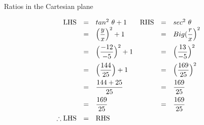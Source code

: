 \begin{wex}{Ratios in the Cartesian plane}
{
\begin{equation*}
\begin{array}{rclrcl}
 \hfill \mbox{LHS} &=&  tan^{2}~\theta + 1 	&	\mbox{RHS}	&=&  	sec^{2}~\theta \hfill \\
\hfill &=& \Big(\dfrac{y}{x}\Big)^{2} + 1  	&	&=&  Big(\dfrac{r}{x}\Big)^{2} \hfill \vspace{5pt} \\
\hfill&=&  \Big(\dfrac{-12}{-5}\Big)^{2} + 1 	&	&=&  \Big(\dfrac{13}{-5}\Big)^{2} \hfill \vspace{5pt}\\
\hfill&=&  \Big (\dfrac{144}{25}\Big) + 1  	&	&=&  \Big(\dfrac{169}{25}\Big)^{2} \hfill \vspace{5pt}\\
\hfill &=& \dfrac{144 + 25}{25} 		&	&=&  \dfrac{169}{25} \hfill \vspace{5pt}\\
\hfill &=& \dfrac{169}{25}  			&	&=&  \dfrac{169}{25} \hfill \vspace{5pt}\\
\hfill \therefore \mbox{LHS} &=& \mbox{RHS}&& \hfill

\end{array}
\end{equation*}

}
\end{wex}


